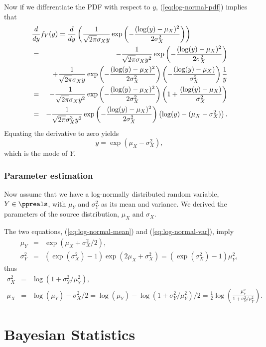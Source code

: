 Now if we differentiate the PDF with respect to $y$,
(\ref{eq:log-normal-pdf}) implies that
\begin{eqnarray*}
\lefteqn{
\frac{d}{dy} f_Y(y)
= \frac{d}{dy} \left(\frac{1}{\sqrt{2\pi} \sigma_X y}  \exp\left(-\frac{(\log(y)-\mu_X)^2}{2\sigma_X^2}\right)\right)
}
\\
&=&
-\frac{1}{\sqrt{2\pi} \sigma_X y^2}  \exp\left(-\frac{(\log(y)-\mu_X)^2}{2\sigma_X^2}\right)
\\
&&
+
\frac{1}{\sqrt{2\pi} \sigma_X y}  \exp\left(-\frac{(\log(y)-\mu_X)^2}{2\sigma_X^2}\right)
\left(-\frac{(\log(y)-\mu_X)}{\sigma_X^2}\right)
\frac{1}{y}
\\
&=&
-\frac{1}{\sqrt{2\pi} \sigma_X y^2}  \exp\left(-\frac{(\log(y)-\mu_X)^2}{2\sigma_X^2}\right)
\left(1+\frac{(\log(y)-\mu_X)}{\sigma_X^2} \right)
\\
&=&
-\frac{1}{\sqrt{2\pi} \sigma_X^3 y^2}  \exp\left(-\frac{(\log(y)-\mu_X)^2}{2\sigma_X^2}\right)
\left(\log(y)-(\mu_X-\sigma_X^2) \right).
\end{eqnarray*}
Equating the derivative to zero yields
\begin{equation}
y = \exp(\mu_X-\sigma_X^2),
\end{equation}
which is the mode of $Y$.


\subsection{Parameter estimation}

Now assume that we have a log-normally distributed random variable, $Y\in\ppreals$,
with $\mu_Y$ and $\sigma_Y^2$ as its mean and variance.
We derived the parameters of the source distribution, $\mu_X$ and $\sigma_X$.

The two equations, (\ref{eq:log-normal-mean}) and (\ref{eq:log-normal-var}), imply
\begin{eqnarray*}
\mu_Y &=& \exp(\mu_X+\sigma_X^2/2),
\\
\sigma_Y^2 &=& (\exp(\sigma_X^2)-1)\exp(2\mu_X+\sigma_X^2) = (\exp(\sigma_X^2)-1) \mu_Y^2,
\end{eqnarray*}
thus
\begin{eqnarray*}
\sigma_X^2 &=& \log(1+{\sigma_Y^2}/{\mu_Y^2}),
\\
\mu_X &=& \log(\mu_Y) - \sigma_X^2/2 = \log(\mu_Y) - \log(1+{\sigma_Y^2}/{\mu_Y^2})/2
= \frac{1}{2} \log\left(\frac{\mu_Y^2}{1+{\sigma_Y^2}/{\mu_Y^2}}\right).
\end{eqnarray*}


\chapter{Bayesian Statistics}

